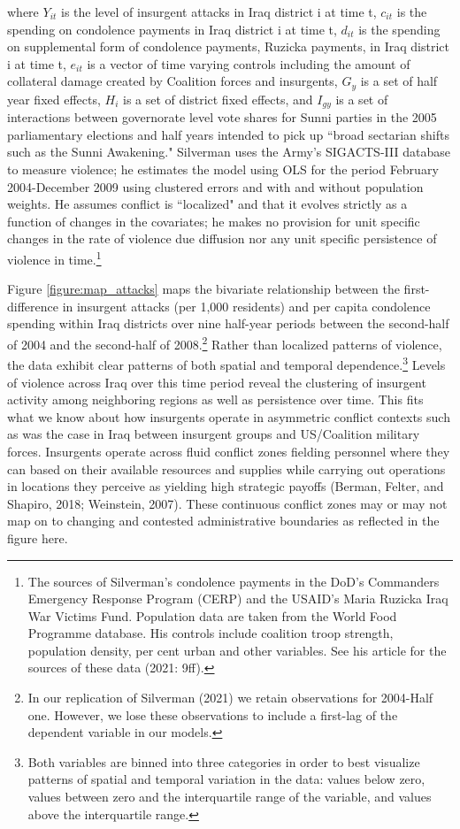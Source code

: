 \documentclass[12pt]{article}
\begin{document}
where $Y_{it}$ is the level of insurgent attacks in Iraq district i at time t, $c_{it}$ is the spending on condolence payments in Iraq district i at time t, $d_{it}$ is the spending on supplemental form of condolence payments, Ruzicka payments, in Iraq district i at time t, $e_{it}$ is a vector of time varying controls including the amount of collateral damage created by Coalition forces and insurgents, $G_y$ is a set of half year fixed effects, $H_i$ is a set of district fixed effects, and $I_{gy}$ is a set of interactions between governorate level vote shares for Sunni parties in the 2005 parliamentary elections and half years intended to pick up ``broad sectarian shifts such as the Sunni Awakening." Silverman uses the Army's SIGACTS-III database to measure violence; he estimates the model using OLS for the period February 2004-December 2009 using clustered errors and with and without population weights. He assumes conflict is ``localized" and that it evolves strictly as a function of changes in the covariates; he makes no provision for unit specific changes in the rate of violence due diffusion nor any unit specific persistence of violence in time.\footnote{The sources of Silverman's condolence payments in the DoD's Commanders Emergency Response Program (CERP) and the USAID's Maria Ruzicka Iraq War Victims Fund. Population data are taken from the World Food Programme database. His controls include coalition troop strength, population density, per cent urban and other variables. See his article for the sources of these data (2021: 9ff).}


Figure \ref{figure:map_attacks} maps the bivariate relationship between the first-difference in insurgent attacks (per 1,000 residents) and per capita condolence spending within Iraq districts over nine half-year periods between the second-half of 2004 and the second-half of 2008.\footnote{In our replication of Silverman (2021) we retain observations for 2004-Half one. However, we lose these observations to include a first-lag of the dependent variable in our models.} Rather than localized patterns of violence, the data exhibit clear patterns of both spatial and temporal dependence.\footnote{Both variables are binned into three categories in order to best visualize patterns of spatial and temporal variation in the data: values below zero, values between zero and the interquartile range of the variable, and values above the interquartile range.} Levels of violence across Iraq over this time period reveal the clustering of insurgent activity among neighboring regions as well as persistence over time. This fits what we know about how insurgents operate in asymmetric conflict contexts such as was the case in Iraq between insurgent groups and US/Coalition military forces. Insurgents operate across fluid conflict zones fielding personnel where they can based on their available resources and supplies while carrying out operations in locations they perceive as yielding high strategic payoffs (Berman, Felter, and Shapiro, 2018; Weinstein, 2007). These continuous conflict zones may or may not map on to changing and contested administrative boundaries as reflected in the figure here.
\end{document}

